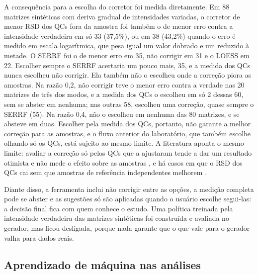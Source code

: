 A consequência para a escolha do corretor foi medida diretamente. Em 88 matrizes sintéticas com deriva gradual de intensidades variadas, o corretor de menor RSD dos QCs fora da amostra foi também o de menor erro contra a intensidade verdadeira em só 33 (37,5\%), ou em 38 (43,2\%) quando o erro é medido em escala logarítmica, que pesa igual um valor dobrado e um reduzido à metade. O SERRF foi o de menor erro em 35, não corrigir em 31 e o LOESS em 22. Escolher sempre o SERRF acertaria um pouco mais, 35, e a medida dos QCs nunca escolheu não corrigir. Ela também não o escolheu onde a correção piora as amostras. Na razão 0,2, não corrigir teve o menor erro contra a verdade nas 20 matrizes de três dos modos, e a medida dos QCs o escolheu em só 2 dessas 60, sem se abster em nenhuma; nas outras 58, escolheu uma correção, quase sempre o SERRF (55). Na razão 0,4, não o escolheu em nenhuma das 80 matrizes, e se absteve em duas. Escolher pela medida dos QCs, portanto, não garante a melhor correção para as amostras, e o fluxo anterior do laboratório, que também escolhe olhando só os QCs, está sujeito ao mesmo limite. A literatura aponta o mesmo limite: avaliar a correção só pelos QCs que a ajustaram tende a dar um resultado otimista e não mede o efeito sobre as amostras \cite{martens2023instrumental}, e há casos em que o RSD dos QCs cai sem que amostras de referência independentes melhorem \cite{brunius2016large}.

Diante disso, a ferramenta inclui não corrigir entre as opções, a medição completa pode se abster e as sugestões só são aplicadas quando o usuário escolhe segui-las: a decisão final fica com quem conhece o estudo. Uma política treinada pela intensidade verdadeira das matrizes sintéticas foi construída e avaliada no gerador, mas ficou desligada, porque nada garante que o que vale para o gerador valha para dados reais.

\subsection{Aprendizado de máquina nas análises}

